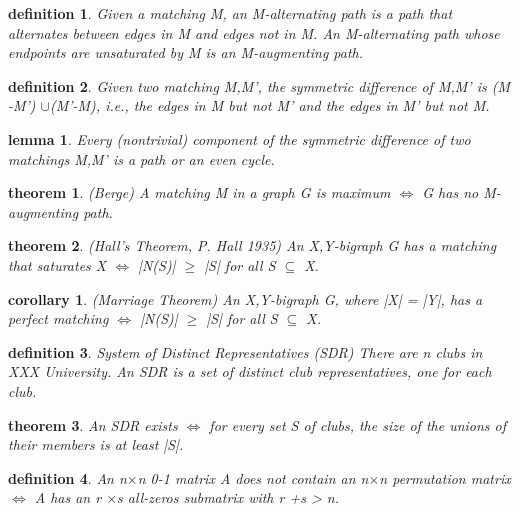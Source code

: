 \documentclass[twocolumn]{article}
\newtheorem{theorem}{theorem}[section]  %
\newtheorem{definition}{definition}
\newtheorem{lemma}{lemma}
\newtheorem{corollary}{corollary}
\begin{document}
\begin{CJK*}{UTF8}{bkai}
    \begin{definition}
        Given a matching M, an M-alternating path is a path that alternates between
 edges in M and edges not in M. An M-alternating path whose endpoints are
 unsaturated by M is an M-augmenting path.
    \end{definition}

    \begin{definition}
        Given two matching M,M', the symmetric difference of M,M' is
 (M -M') $\cup$(M'-M), i.e., the edges in M but not M' and the edges in M'
 but not M.
    \end{definition}

    \begin{lemma}
        Every (nontrivial) component of the symmetric difference of two matchings
 M,M' is a path or an even cycle.
    \end{lemma}

    \begin{theorem}{(Berge)}
        A matching M in a graph G is maximum $\iff$ G has no M-augmenting path.
    \end{theorem}

    \begin{theorem}{ (Hall's Theorem, P. Hall 1935)}
         An X,Y-bigraph G has a matching that saturates X $\iff$ |N(S)| $\geq$ |S| for all
 S $\subseteq$ X.
    \end{theorem}

    \begin{corollary}{(Marriage Theorem)}
        An X,Y-bigraph G, where |X| = |Y|, has a perfect matching $\iff$ |N(S)| $\geq$ |S|
 for all S $\subseteq$ X.
    \end{corollary}

    \begin{definition}
        System of Distinct Representatives (SDR)
 There are n clubs in XXX University. An SDR is a set of distinct club
 representatives, one for each club.
    \end{definition}

    \begin{theorem}
        An SDR exists $\iff$ for every set S of clubs, the size of the unions of their
 members is at least |S|.
    \end{theorem}

    \begin{definition}
        An n$\times$n 0-1 matrix A does not contain an n$\times$n permutation matrix $\iff$ A
 has an r $\times$s all-zeros submatrix with r +s > n.
    \end{definition}


\end{CJK*}
\end{document}
